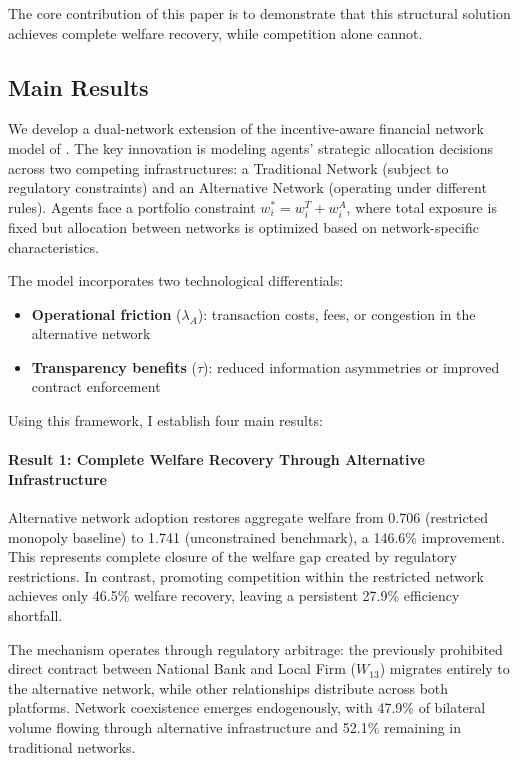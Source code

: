 \documentclass[12pt]{article}
\begin{document}
The core contribution of this paper is to demonstrate that this structural solution achieves complete welfare recovery, while competition alone cannot.

\subsection{Main Results}

We develop a dual-network extension of the incentive-aware financial network model of \citet{jalan_incentive-aware_2024}. The key innovation is modeling agents' strategic allocation decisions across two competing infrastructures: a Traditional Network (subject to regulatory constraints) and an Alternative Network (operating under different rules). Agents face a portfolio constraint $w_i^* = w_i^T + w_i^A$, where total exposure is fixed but allocation between networks is optimized based on network-specific characteristics.

The model incorporates two technological differentials:
\begin{itemize}[noitemsep]
    \item \textbf{Operational friction} ($\lambda_A$): transaction costs, fees, or congestion in the alternative network
    \item \textbf{Transparency benefits} ($\tau$): reduced information asymmetries or improved contract enforcement
\end{itemize}

Using this framework, I establish four main results:

\paragraph{Result 1: Complete Welfare Recovery Through Alternative Infrastructure}

Alternative network adoption restores aggregate welfare from 0.706 (restricted monopoly baseline) to 1.741 (unconstrained benchmark), a 146.6\% improvement. This represents complete closure of the welfare gap created by regulatory restrictions. In contrast, promoting competition within the restricted network achieves only 46.5\% welfare recovery, leaving a persistent 27.9\% efficiency shortfall.

The mechanism operates through regulatory arbitrage: the previously prohibited direct contract between National Bank and Local Firm ($W_{13}$) migrates entirely to the alternative network, while other relationships distribute across both platforms. Network coexistence emerges endogenously, with 47.9\% of bilateral volume flowing through alternative infrastructure and 52.1\% remaining in traditional networks.
\end{document}

